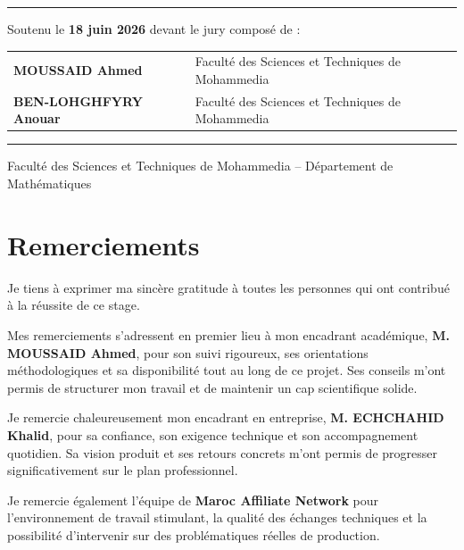 \documentclass[12pt,a4paper,openany]{report}
\begin{document}
\begin{titlepage}
\vfill

\rule{\linewidth}{0.4pt}
\vspace{0.3cm}

{\normalsize Soutenu le \textbf{18 juin 2026} devant le jury composé de :}

\vspace{0.3cm}

\begin{tabular}{ll}
\textbf{MOUSSAID Ahmed} & Faculté des Sciences et Techniques de Mohammedia \\[0.2em]
\textbf{BEN-LOHGHFYRY Anouar} & Faculté des Sciences et Techniques de Mohammedia \\
\end{tabular}

\vspace{0.4cm}
\rule{\linewidth}{0.8pt}
\vspace{0.2cm}

{\small Faculté des Sciences et Techniques de Mohammedia -- Département de Mathématiques}
\end{titlepage}

\chapter*{Remerciements}

Je tiens à exprimer ma sincère gratitude à toutes les personnes qui ont contribué à la réussite de ce stage.

Mes remerciements s'adressent en premier lieu à mon encadrant académique, \textbf{M. MOUSSAID Ahmed}, pour son suivi rigoureux, ses orientations méthodologiques et sa disponibilité tout au long de ce projet. Ses conseils m'ont permis de structurer mon travail et de maintenir un cap scientifique solide.

Je remercie chaleureusement mon encadrant en entreprise, \textbf{M. ECHCHAHID Khalid}, pour sa confiance, son exigence technique et son accompagnement quotidien. Sa vision produit et ses retours concrets m'ont permis de progresser significativement sur le plan professionnel.

Je remercie également l'équipe de \textbf{Maroc Affiliate Network} pour l'environnement de travail stimulant, la qualité des échanges techniques et la possibilité d'intervenir sur des problématiques réelles de production.
\end{document}
